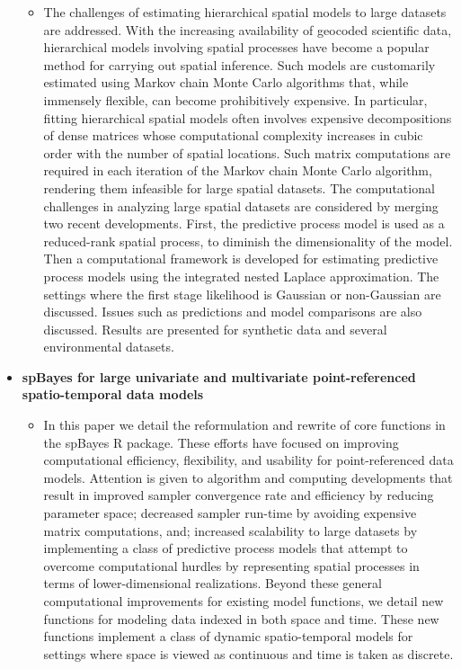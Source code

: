 \documentclass{article}
\begin{document}
\begin{itemize}
\begin{itemize}
  \item The challenges of estimating hierarchical spatial models to large datasets are addressed. With the increasing availability of geocoded scientific data, hierarchical models involving spatial processes have become a popular method for carrying out spatial inference. Such models are customarily estimated using Markov chain Monte Carlo algorithms that, while immensely flexible, can become prohibitively expensive. In particular, fitting hierarchical spatial models often involves expensive decompositions of dense matrices whose computational complexity increases in cubic order with the number of spatial locations. Such matrix computations are required in each iteration of the Markov chain Monte Carlo algorithm, rendering them infeasible for large spatial datasets. The computational challenges in analyzing large spatial datasets are considered by merging two recent developments. First, the predictive process model is used as a reduced-rank spatial process, to diminish the dimensionality of the model. Then a computational framework is developed for estimating predictive process models using the integrated nested Laplace approximation. The settings where the first stage likelihood is Gaussian or non-Gaussian are discussed. Issues such as predictions and model comparisons are also discussed. Results are presented for synthetic data and several environmental datasets.
  \end{itemize}
\item {\bf spBayes for large univariate and multivariate point-referenced spatio-temporal data models} \citep{Finley2013}
  \begin{itemize}
  \item In this paper we detail the reformulation and rewrite of core functions in the spBayes R package. These efforts have focused on improving computational efficiency, flexibility, and usability for point-referenced data models. Attention is given to algorithm and computing developments that result in improved sampler convergence rate and efficiency by reducing parameter space; decreased sampler run-time by avoiding expensive matrix computations, and; increased scalability to large datasets by implementing a class of predictive process models that attempt to overcome computational hurdles by representing spatial processes in terms of lower-dimensional realizations. Beyond these general computational improvements for existing model functions, we detail new functions for modeling data indexed in both space and time. These new functions implement a class of dynamic spatio-temporal models for settings where space is viewed as continuous and time is taken as discrete.
  \end{itemize}
\end{itemize}
\end{document}
